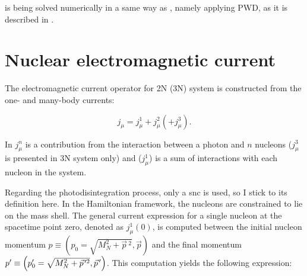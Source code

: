      is being solved numerically in a same way as , namely applying
    PWD, as it is described in \cite{GLOCKLE_report_1996}.


    \section{Nuclear electromagnetic current}
    \label{sec_current}
    

    The electromagnetic current operator for 2N (3N) system is constructed 
    from the one- and many-body currents:
    
    \begin{equation}
        j_\mu = j_\mu^1 + j_\mu^2 (+ j_\mu^3).
        \label{j_mu_gen}
    \end{equation}

    In  $j_\mu^n$ is a contribution from the interaction between a photon and 
    $n$ nucleons ($j_\mu^3$ is presented in 3N system only)
    and ($j_\mu^1$) is a sum of interactions with each nucleon in the system. 



    Regarding the photodisintegration process, only a \gls{snc} is used, so I stick to its definition here.
    In the Hamiltonian framework, the nucleons are constrained to lie on the mass shell.
    The general current expression for a
    single nucleon at the spacetime point zero, denoted as $j^1_\mu(0)$, is computed between the initial nucleon momentum
    $p \equiv\left(p_0=\sqrt{M_N^2+\vec{p}\,^2}, \vec{p}\right)$
    and the final momentum
    $p^{\prime} \equiv\left(p_0^{\prime}=\sqrt{M_N^2+\pvec{p}^{2}}, \pvec{p}\right)$. This computation yields the following expression:

